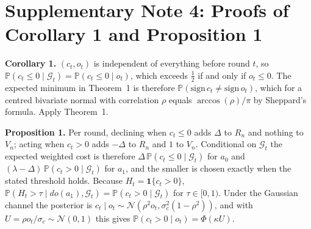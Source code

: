 \documentclass[11pt,a4paper]{article}
\begin{document}
\begin{table}[h]
\caption{\textbf{Paired tests at matched operating points, lending with real default labels} (50
held-out seeds). Bold: 95\% bootstrap CI excludes zero.}
\centering\small
\resizebox{\linewidth}{!}{}
\end{table}

\begin{table}[h]
\caption{\textbf{IHDP, GLM versus a calibrated Beta--Bernoulli cell model} (full method minus variant,
50 held-out seeds). Top: the same-$\alpha$ comparison specified before the run. Bottom: post hoc, at
matched violation. Bold: CI excludes zero.}
\centering\small
\resizebox{\linewidth}{!}{}
\end{table}

\begin{table}[h]
\caption{\textbf{MIMIC-IV simulator validation.} Model choice uses grouped 5-fold cross-validation on
the fit half (stays never split across folds); the last row evaluates the chosen models on held-out
stays. The original in-sample figures are shown for comparison and are not valid estimates.}
\centering\small
\resizebox{\linewidth}{!}{}
\end{table}

\begin{table}[h]
\caption{\textbf{MIMIC-IV exploratory harm finding:} arrhythmia rate, policy minus clinicians, across
softening $\varepsilon$ and importance-weight cap. Intervals resample stays (2,000 replicates).}
\centering\small

\end{table}

\section*{Supplementary Note 4: Proofs of Corollary 1 and Proposition 1}
\noindent\textbf{Corollary 1.} $(c_t,o_t)$ is independent of everything before round $t$, so
$\mathbb P(c_t\le0\mid\mathcal G_t)=\mathbb P(c_t\le0\mid o_t)$, which exceeds $\tfrac12$ if and only if
$o_t\le0$. The expected minimum in Theorem~1 is therefore
$\mathbb P(\mathrm{sign}\,c_t\ne\mathrm{sign}\,o_t)$, which for a centred bivariate normal with
correlation $\rho$ equals $\arccos(\rho)/\pi$ by Sheppard's formula. Apply
Theorem~1.


\noindent\textbf{Proposition 1.} Per round, declining when $c_t\le0$ adds $\Delta$ to $R_n$ and nothing to $V_n$; acting when $c_t>0$ adds $-\Delta$ to $R_n$ and $1$ to $V_n$. Conditional on $\mathcal G_t$ the expected weighted cost is therefore $\Delta\,\mathbb P(c_t\le0\mid\mathcal G_t)$ for $a_0$ and $(\lambda-\Delta)\,\mathbb P(c_t>0\mid\mathcal G_t)$ for $a_1$, and the smaller is chosen exactly when the stated threshold holds. Because $H_t=\mathbf 1\{c_t>0\}$, $\mathbb P(H_t>\tau\mid do(a_1),\mathcal G_t)=\mathbb P(c_t>0\mid\mathcal G_t)$ for $\tau\in[0,1)$. Under the Gaussian channel the posterior is $c_t\mid o_t\sim\mathcal N(\rho^2o_t,\sigma_c^2(1-\rho^2))$, and with $U=\rho o_t/\sigma_c\sim\mathcal N(0,1)$ this gives $\mathbb P(c_t>0\mid o_t)=\Phi(\kappa U)$.
\end{document}
